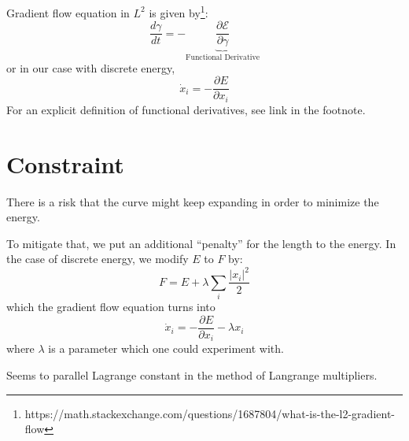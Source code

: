 \documentclass[a4paper, 11pt]{article}
\theoremstyle{definition}
\begin{document}
Gradient flow equation in $L^2$ is given by\footnote{
    https://math.stackexchange.com/questions/1687804/what-is-the-l2-gradient-flow
}:
\begin{equation}
    \frac{d \gamma}{dt} = - \underbrace{\frac{\partial \mathcal{E}}{\partial \gamma}}_{\text{Functional Derivative}}
\end{equation}
or in our case with discrete energy,
\begin{equation}
    \dot{x}_i = - \frac{\partial E}{\partial x_i}
\end{equation}
For an explicit definition of functional derivatives, see link in the footnote.

\section{Constraint}
There is a risk that the curve might keep expanding in order to minimize the energy.

To mitigate that, we put an additional ``penalty'' for the length to the energy.
In the case of discrete energy, we modify $E$ to $F$ by:
\begin{equation}
    F = E + \lambda \sum_i \frac{|x_i|^2}{2}
\end{equation}
which the gradient flow equation turns into
\begin{equation}
    \dot{x}_i =  - \frac{\partial E}{\partial x_i} - \lambda x_i
\end{equation}
where $\lambda$ is a parameter which one could experiment with.

Seems to parallel Lagrange constant in the method of Langrange multipliers.
\end{document}
